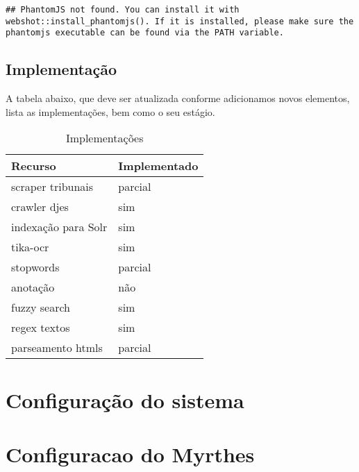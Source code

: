 \documentclass[]{book}
\begin{document}
\begin{verbatim}
## PhantomJS not found. You can install it with webshot::install_phantomjs(). If it is installed, please make sure the phantomjs executable can be found via the PATH variable.
\end{verbatim}

\hypertarget{implementacao}{%
\section{Implementação}\label{implementacao}}

A tabela abaixo, que deve ser atualizada conforme adicionamos novos elementos, lista as implementações, bem como o seu estágio.

\begin{table}[t]

\caption{\label{tab:tab-imp}Implementações}
\centering
\begin{tabular}{ll}
\toprule
Recurso & Implementado\\
\midrule
scraper tribunais & parcial\\
crawler djes & sim\\
indexação para Solr & sim\\
tika-ocr & sim\\
stopwords & parcial\\
\addlinespace
anotação & não\\
fuzzy search & sim\\
regex textos & sim\\
parseamento htmls & parcial\\
\bottomrule
\end{tabular}
\end{table}

\hypertarget{section}{%
\section{}\label{section}}

\hypertarget{sysconf}{%
\chapter{Configuração do sistema}\label{sysconf}}

\hypertarget{section-1}{%
\section{}\label{section-1}}

\hypertarget{myrconf}{%
\chapter{Configuracao do Myrthes}\label{myrconf}}
\end{document}
